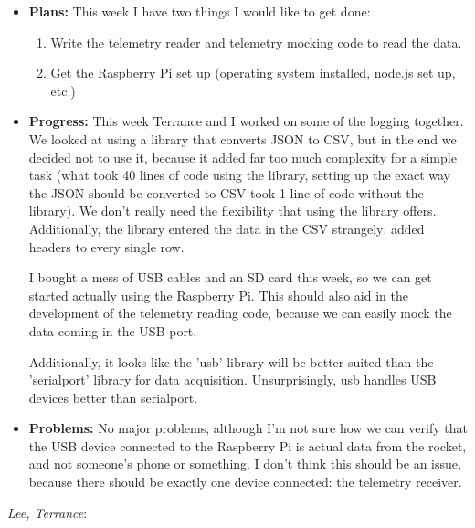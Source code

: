 \documentclass[10pt,draftclsnofoot,onecolumn]{IEEEtran}
\newcommand{\subsubsubsection}[1]{
	\hfill\break\textit{#1}:
}
\begin{document}
\begin{itemize}
	\item \textbf{Plans: }
	This week I have two things I would like to get done:

	\begin{enumerate}
		\item Write the telemetry reader and telemetry mocking code to read the data.
		\item Get the Raspberry Pi set up (operating system installed, node.js set up, etc.)
	\end{enumerate}

	\item \textbf{Progress: }
	This week Terrance and I worked on some of the logging together. We looked at using a library that converts JSON to CSV, but in the end we decided not to use it, because it added far too much complexity for a simple task (what took 40 lines of code using the library, setting up the exact way the JSON should be converted to CSV took 1 line of code without the library). We don't really need the flexibility that using the library offers. Additionally, the library entered the data in the CSV strangely: added headers to every single row.

	I bought a mess of USB cables and an SD card this week, so we can get started actually using the Raspberry Pi. This should also aid in the development of the telemetry reading code, because we can easily mock the data coming in the USB port.

	Additionally, it looks like the 'usb' library will be better suited than the 'serialport' library for data acquisition. Unsurprisingly, usb handles USB devices better than serialport.
	\item \textbf{Problems: }
	No major problems, although I'm not sure how we can verify that the USB device connected to the Raspberry Pi is actual data from the rocket, and not someone's phone or something. I don't think this should be an issue, because there should be exactly one device connected: the telemetry receiver.
\end{itemize}
\subsubsubsection{Lee, Terrance}
\end{document}
